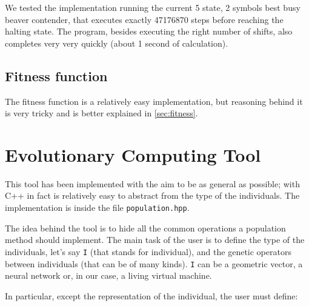 \documentclass{report}
\begin{document}
We tested the implementation running the current 5 state, 2 symbols best busy beaver contender, that executes exactly 47176870 steps before reaching the halting state. The program, besides executing the right number of shifts, also completes very very quickly (about 1 second of calculation).

\subsection{Fitness function}
The fitness function is a relatively easy implementation, but reasoning behind it is very tricky and is better explained in \ref{sec:fitness}.

\section{Evolutionary Computing Tool}
This tool has been implemented with the aim to be as general as possible; with C++ in fact is relatively easy to abstract from the type of the individuals. The implementation is inside the file \texttt{population.hpp}.

The idea behind the tool is to hide all the common operations a population method should implement. The main task of the user is to define the type of the individuals, let's say \texttt{I} (that stands for individual), and the genetic operators between individuals (that can be of many kinds). \texttt{I} can be a geometric vector, a neural network or, in our case, a living virtual machine.

In particular, except the representation of the individual, the user must define:
\end{document}
